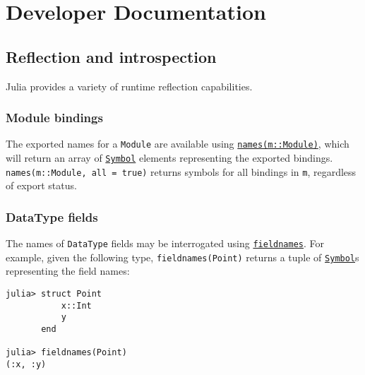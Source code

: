 

\part{Developer Documentation}


\hypertarget{4173225665417100846}{}


\chapter{Reflection and introspection}



Julia provides a variety of runtime reflection capabilities.



\hypertarget{17771187696170422072}{}


\section{Module bindings}



The exported names for a \texttt{Module} are available using \hyperlink{6473328671144201991}{\texttt{names(m::Module)}}, which will return an array of \hyperlink{18332791376992528422}{\texttt{Symbol}} elements representing the exported bindings. \texttt{names(m::Module, all = true)} returns symbols for all bindings in \texttt{m}, regardless of export status.



\hypertarget{14774754942140904122}{}


\section{DataType fields}



The names of \texttt{DataType} fields may be interrogated using \hyperlink{17481253338332315021}{\texttt{fieldnames}}. For example, given the following type, \texttt{fieldnames(Point)} returns a tuple of \hyperlink{18332791376992528422}{\texttt{Symbol}}s representing the field names:




\begin{verbatim}
julia> struct Point
           x::Int
           y
       end

julia> fieldnames(Point)
(:x, :y)
\end{verbatim}



